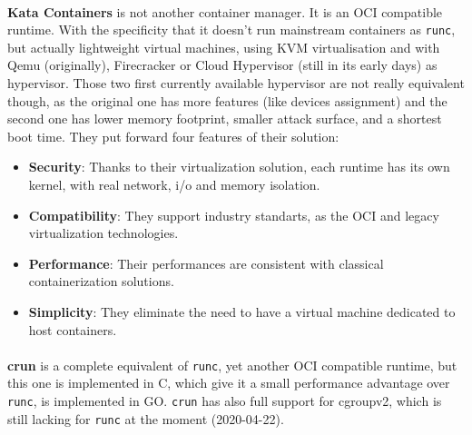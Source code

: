 \paragraph{}\textbf{Kata Containers} is not another container manager.  It is an OCI compatible runtime.  With the specificity that it doesn't run mainstream containers as \texttt{runc}, but actually lightweight virtual machines, using KVM virtualisation and with Qemu (originally), Firecracker or Cloud Hypervisor (still in its early days) as hypervisor.  Those two first currently available hypervisor are not really equivalent though, as the original one has more features (like devices assignment) and the second one has lower memory footprint, smaller attack surface, and a shortest boot time.
They put forward four features of their solution:
\begin{itemize}
\renewcommand\labelitemi{--}
  \item \textbf{Security}: Thanks to their virtualization solution, each runtime has its own kernel, with real network, i/o and memory isolation.
  \item \textbf{Compatibility}:  They support industry standarts, as the OCI\cite{oci} and legacy virtualization technologies.
  \item \textbf{Performance}:  Their performances are consistent with classical containerization solutions.
  \item \textbf{Simplicity}:  They eliminate the need to have a virtual machine dedicated to host containers.
\end{itemize}

\paragraph{}\textbf{crun} is a complete equivalent of \texttt{runc}, yet another OCI compatible runtime, but this one is implemented in C, which give it a small performance advantage over \texttt{runc}, is implemented in GO.  \texttt{crun} has also full support for cgroupv2, which is still lacking for \texttt{runc} at the moment (2020-04-22).
